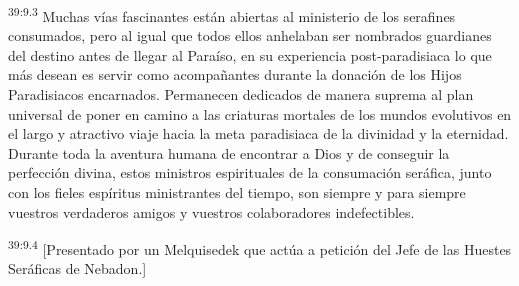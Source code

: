 \par
\textsuperscript{39:9.3} Muchas vías fascinantes están abiertas al ministerio de los serafines consumados, pero al igual que todos ellos anhelaban ser nombrados guardianes del destino antes de llegar al Paraíso, en su experiencia post-paradisiaca lo que más desean es servir como acompañantes durante la donación de los Hijos Paradisiacos encarnados. Permanecen dedicados de manera suprema al plan universal de poner en camino a las criaturas mortales de los mundos evolutivos en el largo y atractivo viaje hacia la meta paradisiaca de la divinidad y la eternidad. Durante toda la aventura humana de encontrar a Dios y de conseguir la perfección divina, estos ministros espirituales de la consumación seráfica, junto con los fieles espíritus ministrantes del tiempo, son siempre y para siempre vuestros verdaderos amigos y vuestros colaboradores indefectibles.

\par
\textsuperscript{39:9.4} [Presentado por un Melquisedek que actúa a petición del Jefe de las Huestes Seráficas de Nebadon.]